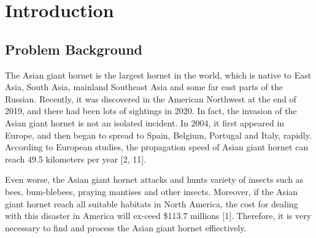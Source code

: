 \documentclass[../mcmpaper]{subfiles}
\begin{document}
	\section{Introduction}
	\subsection{Problem Background}
	The Asian giant hornet is the largest hornet in the world, which is native to East Asia, South Asia, mainland Southeast Asia and some far east parts of the Russian. Recently, it was discovered in the American Northwest at the end of 2019, and there had been lots of sightings in 2020. In fact, the invasion of the Asian giant hornet is not an isolated incident.  In 2004, it first appeared in Europe, and then began to spread to Spain, Belgium, Portugal and Italy, rapidly. According to European studies, the propagation speed of Asian giant hornet can reach 49.5 kilometers per year [2, 11].
	\par
    Even worse, the Asian giant hornet attacks and hunts variety of insects such as bees, bum-blebees, praying mantises and other insects. Moreover, if the Asian giant hornet reach all suitable habitats in North America, the cost for dealing with this disaster in America will ex-ceed \$113.7 millions [1]. Therefore, it is very necessary to find and process the Asian giant hornet effiectively.
\end{document}
